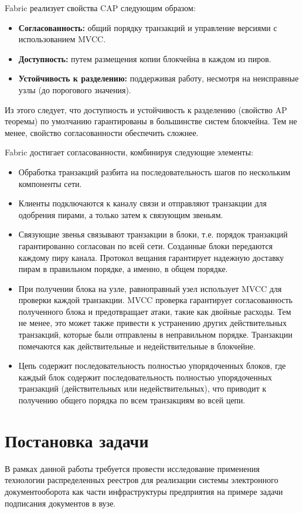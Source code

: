 Fabric реализует свойства CAP следующим образом:
\begin{itemize}
	\item \textbf{Согласованность:} общий порядку транзакций и управление версиями с использованием MVCC.
	\item \textbf{Доступность:} путем размещения копии блокчейна в каждом из пиров.
	\item \textbf{Устойчивость к разделению:} поддерживая работу, несмотря на неисправные узлы (до порогового значения).
\end{itemize}

Из этого следует, что доступность и устойчивость к разделению (свойство AP теоремы) по умолчанию гарантированы в большинстве систем блокчейна. Тем не менее, свойство согласованности обеспечить сложнее.

Fabric достигает согласованности, комбинируя следующие элементы:
\begin{itemize}
	\item Обработка транзакций разбита на последовательность шагов по нескольким компоненты сети.
	\item Клиенты подключаются к каналу связи и отправляют транзакции для одобрения пирами, а только затем к связующим звеньям.
	\item Связующие звенья связывают транзакции в блоки, т.е. порядок транзакций гарантированно согласован по всей сети. Созданные блоки передаются каждому пиру канала. Протокол вещания гарантирует надежную доставку пирам в правильном порядке, а именно, в общем порядке.
	\item При получении блока на узле, равноправный узел использует MVCC для проверки каждой транзакции. MVCC проверка гарантирует согласованность полученного блока и предотвращает атаки, такие как двойные расходы. Тем не менее, это может также привести к устранению других действительных транзакций, которые были отправлены в неправильном порядке. Транзакции помечаются как действительные и недействительные в блокчейне.
	\item Цепь содержит последовательность полностью упорядоченных блоков, где каждый блок содержит последовательность полностью упорядоченных транзакций (действительных или недействительных), что приводит к получению общего порядка по всем транзакциям во всей цепи.
\end{itemize}
\section{Постановка задачи} \label{sec:ch1/sec5}
В рамках данной работы требуется провести исследование применения технологии распределенных реестров для реализации системы электронного документооборота как части инфраструктуры предприятия на примере задачи подписания документов в вузе.

